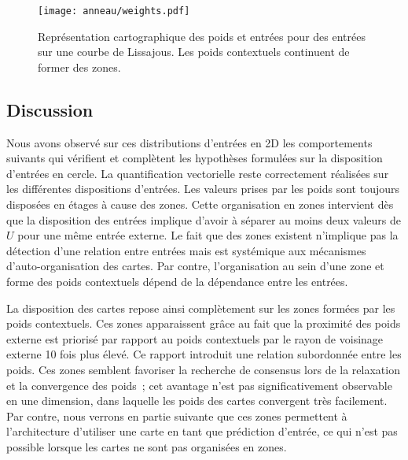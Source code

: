 \documentclass[../main]{subfiles}
\begin{document}
\begin{figure}
	\centering\texttt{[image: anneau/weights.pdf]}
	\caption{Représentation cartographique des poids et entrées pour des entrées sur une courbe de Lissajous. Les poids contextuels continuent de former des zones.}
\end{figure}



\subsection{Discussion}

Nous avons observé sur ces distributions d'entrées en 2D les comportements suivants qui vérifient et complètent les hypothèses formulées sur la disposition d'entrées en cercle.
La quantification vectorielle reste correctement réalisées sur les différentes dispositions d'entrées. Les valeurs prises par les poids sont toujours disposées en étages à cause des zones.
Cette organisation en zones intervient dès que la disposition des entrées implique d'avoir à séparer au moins deux valeurs de $U$ pour une même entrée externe. Le fait que des zones existent n'implique pas la détection d'une relation entre entrées mais est systémique aux mécanismes d'auto-organisation des cartes. Par contre, l'organisation au sein d'une zone et forme des poids contextuels dépend de la dépendance entre les entrées.


La disposition des cartes repose ainsi complètement sur les zones formées par les poids contextuels. Ces zones apparaissent grâce au fait que la proximité des poids externe est priorisé par rapport au poids contextuels par le rayon de voisinage externe 10 fois plus élevé. Ce rapport introduit une relation subordonnée entre les poids. 
Ces zones semblent favoriser la recherche de consensus lors de la relaxation et la convergence des poids~; cet avantage n'est pas significativement observable en une dimension, dans laquelle les poids des cartes convergent très facilement.
Par contre, nous verrons en partie suivante que ces zones permettent à l'architecture d'utiliser une carte en tant que prédiction d'entrée, ce qui n'est pas possible lorsque les cartes ne sont pas organisées en zones.
\end{document}
